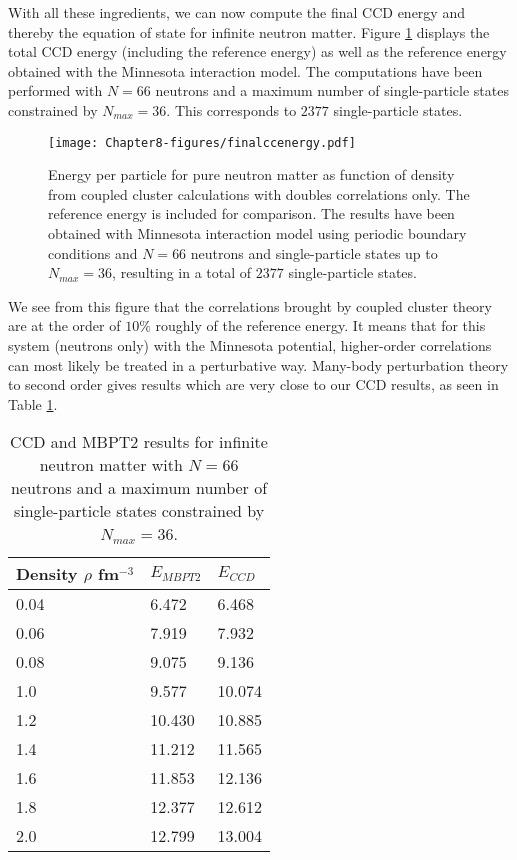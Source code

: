 \documentclass[thesis.tex]{subfiles}
\begin{document}
With all these ingredients, we can now compute the final CCD energy and thereby the equation of state for infinite neutron matter.
Figure \ref{fig:finalccdenergy} displays the total CCD energy (including the reference energy) as well as the reference energy
obtained with the Minnesota interaction model. The computations have been performed with $N=66$ neutrons and a maximum number of single-particle states constrained by $N_{max}=36$. This corresponds to $2377$ single-particle states. 
  \begin{figure}
    \texttt{[image: Chapter8-figures/finalccenergy.pdf]}
    \caption{Energy per particle for pure neutron matter as function of density from coupled cluster calculations with doubles correlations  only. The reference energy is included for comparison. The results have been obtained with Minnesota interaction model using periodic  boundary conditions and $N=66$ neutrons and single-particle states up to $N_{max}=36$, resulting in a total of $2377$ single-particle states. }  
    \label{fig:finalccdenergy}
  \end{figure}
We see from this figure that the correlations brought by coupled cluster theory are at the order of $10\%$ roughly of the reference energy. It means that for this system (neutrons only) with the Minnesota potential, higher-order correlations can most likely be treated in a perturbative way. Many-body perturbation theory to second order gives results which are very close to our CCD results, as seen in 
Table \ref{tab:ecomparison}.
\begin{table}
\caption{CCD and MBPT2 results for infinite neutron matter with $N=66$ neutrons and a maximum number of single-particle states constrained by $N_{max}=36$. }\label{tab:ecomparison}
  \begin{center}
      \begin{tabular}{| l | l | l |}
      \hline Density $\rho$ fm$^{-3}$ & $E_{MBPT2}$ & $E_{CCD}$
      \\ \hline 0.04 & 6.472   & 6.468    \\ \hline
      0.06 & 7.919  & 7.932   \\ \hline
      0.08 & 9.075  & 9.136    \\ \hline
      1.0 & 9.577 &  10.074  \\  \hline
      1.2 & 10.430 & 10.885   \\ \hline
      1.4 & 11.212 & 11.565   \\  \hline
      1.6 & 11.853  & 12.136    \\  \hline
      1.8 & 12.377 & 12.612   \\ \hline
      2.0 & 12.799 & 13.004   \\ \hline
      \end{tabular}
  \end{center}
\end{table}
\end{document}
